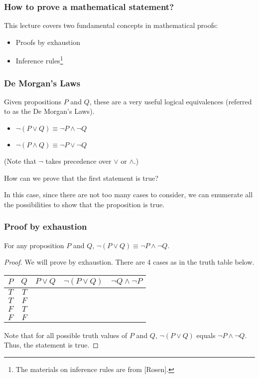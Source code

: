 

\begin{frame}\frametitle{How to prove a mathematical statement?}
  This lecture covers two fundamental concepts in mathematical proofs:
  \begin{itemize}
  \item Proofs by exhaustion
  \item Inference rules\footnote{The materials on inference rules are from [Rosen].}
  \end{itemize}
\end{frame}

\begin{frame}\frametitle{De Morgan's Laws}
  Given propositions $P$ and $Q$, these are a very useful logical
  equivalences (referred to as the De Morgan's Laws).

  \begin{itemize}
  \item $\neg (P\vee Q)\equiv \neg P \wedge \neg Q$
  \item $\neg (P\wedge Q)\equiv \neg P \vee \neg Q$
  \end{itemize}

  (Note that $\neg$ takes precedence over $\vee$ or $\wedge$.)

  \vspace{0.2in}
  
  How can we prove that the first statement is true?
  \pause

  In this case, since there are not too many cases to consider, we can
  enumerate all the possibilities to show that the proposition is
  true.
\end{frame}

\begin{frame}\frametitle{Proof by exhaustion}
  \begin{tcolorbox}
    For any proposition $P$ and $Q$, $\neg (P\vee Q)\equiv \neg P
    \wedge \neg Q$.
  \end{tcolorbox}
  \begin{proof}
    We will prove by exhaustion.  \pause There are 4 cases as in the truth
    table below.

    \vspace{0.1in}
    
    \begin{tabular}{|c|c||c|c|c|}
      \hline
      $P$ & $Q$ & $P\vee Q$ & $\neg(P\vee Q)$ & $\neg Q \wedge \neg P$ \\
      \hline
      $T$ & $T$ & & & \\
      $T$ & $F$ & & & \\
      $F$ & $T$ & & & \\
      $F$ & $F$ & & & \\
      \hline
    \end{tabular}

    \vspace{0.1in}
    \pause

    Note that for all possible truth values of $P$ and $Q$, $\neg
    (P\vee Q)$ equals $\neg P \wedge \neg Q$.  Thus, the statement is
    true.
  \end{proof}
\end{frame}

